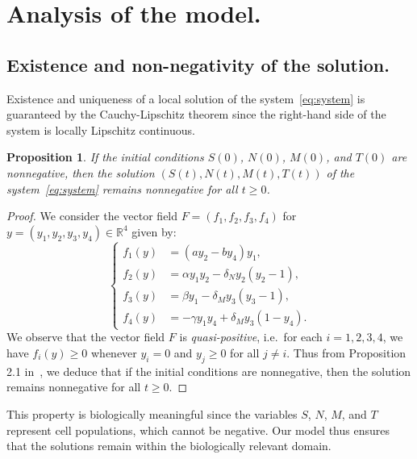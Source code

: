 \documentclass[a4paper, 12pt]{article}
\newtheorem{proposition}{Proposition}[section]
\begin{document}
\bigskip




\section{Analysis of the model.}\label{sec:analysis}
\subsection{Existence and non-negativity of the solution.}
Existence and uniqueness of a local solution of the system~\eqref{eq:system} is guaranteed by the Cauchy-Lipschitz theorem since the right-hand side of the system is locally Lipschitz continuous.
\begin{proposition}\label{prop:positivity}
If the initial conditions $S(0)$, $N(0)$, $M(0)$, and $T(0)$ are nonnegative, then the solution $(S(t), N(t), M(t), T(t))$ of the system~\eqref{eq:system} remains nonnegative for all $t \geq 0$.   
\end{proposition}
\begin{proof}
We consider the vector field $F=(f_1, f_2, f_3, f_4)$ for $y=(y_1, y_2, y_3, y_4)\in \mathbb{R}^4$ given by:
\begin{equation*}
  \left\{
\begin{aligned}
f_1(y) &= (a y_2 - b y_4) y_1, \\
f_2(y) &= \alpha y_1 y_2 - \delta_N y_2 (y_2 - 1), \\
f_3(y) &= \beta y_1 - \delta_M y_3 (y_3 - 1), \\
f_4(y) &= -\gamma y_1 y_4 + \delta_M y_3 (1 - y_4).
\end{aligned}
\right.
\end{equation*}
We observe that the vector field $F$ is \emph{quasi-positive}, i.e.\ for each $i=1,2,3,4$, we have $f_i(y) \geq 0$ whenever $y_i = 0$ and $y_j \geq 0$ for all $j \neq i$. Thus from Proposition 2.1 in~\cite{haraux2016}, we deduce that if the initial conditions are nonnegative, then the solution remains nonnegative for all $t \geq 0$.
\end{proof}
This property is biologically meaningful since the variables $S$, $N$, $M$, and $T$ represent cell populations, which cannot be negative. Our model thus ensures that the solutions remain within the biologically relevant domain.       
\end{document}

